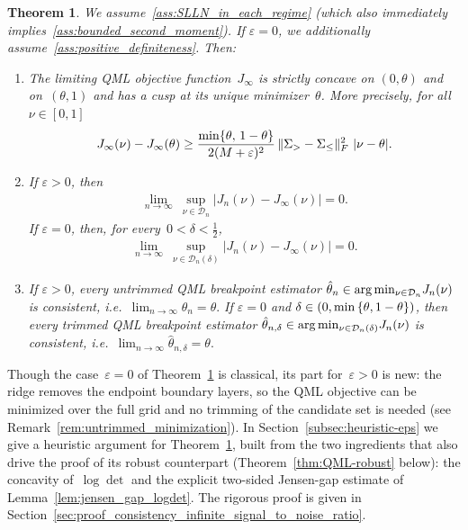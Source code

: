 \documentclass[10pt, letterpaper]{amsart}
\newtheorem{theorem}{Theorem}
\def\min{{\rm min}}
\begin{document}
\begin{theorem}\label{thm:classical_QML_consistency}
We assume~\ref{ass:SLLN_in_each_regime} (which also immediately implies~\ref{ass:bounded_second_moment}). If $\varepsilon=0$, we additionally assume~\ref{ass:positive_definiteness}. Then:
 \begin{enumerate}[label=(\roman*)]
     \item The limiting QML objective function~$J_\infty$ is strictly concave on $(0, \theta)$ and on~$(\theta, 1)$ and has a cusp at its unique minimizer~$\theta$. More precisely, for all~$\nu \in [0,1]$
     \begin{align}\label{equ:cusp_separation_J_infty}
         J_{\infty} (\nu) - J_{\infty}(\theta) \geq \frac{\min\{\theta,\,1-\theta\}}{2(M +\varepsilon)^2}\,\|\Sigma_{>} - \Sigma_{\leq}\|_F^2 \
 |\nu - \theta|.
     \end{align}
     \item If $\varepsilon>0$, then
     \begin{align}\label{equ:uniform_convergence_J_n_untrimmed}
         \lim_{n \to \infty}\ \sup_{\nu \in \mathcal D_n} |J_{n} (\nu) - J_{\infty} (\nu)| = 0.
     \end{align}
     If $\varepsilon=0$, then, for every~$0 < \delta < \frac{1}{2}$,
     \begin{align}\label{equ:uniform_convergence_J_n}
         \lim_{n \to \infty}\ \sup_{\nu \in \mathcal D_n(\delta)} |J_{n} (\nu) - J_{\infty} (\nu)| = 0.
     \end{align}
    \item If $\varepsilon>0$, every untrimmed QML breakpoint estimator $\hat \theta_{n}\in \arg \min_{\nu \in \mathcal D_n} J_n(\nu)$ is consistent, i.e.~$\lim_{n \to \infty} \hat \theta_n = \theta.$ \newline
If $\varepsilon=0$ and $\delta \in (0, \min\left\{ \theta, 1 - \theta \right\})$, then every trimmed QML breakpoint estimator $\hat \theta_{n,\delta}\in \arg \min_{\nu \in \mathcal D_n(\delta)} J_n(\nu)$ is consistent, i.e.~$\lim_{n \to \infty} \hat \theta_{n,\delta} = \theta.$
 \end{enumerate}
\end{theorem}

 Though the case~$\varepsilon=0$ of Theorem~\ref{thm:classical_QML_consistency} is classical, its part for~$\varepsilon>0$ is new: the ridge removes the endpoint boundary layers, so the QML objective can be minimized over the full grid and no trimming of the candidate set is needed (see Remark~\ref{rem:untrimmed_minimization}).
In Section~\ref{subsec:heuristic-eps} we give a heuristic argument for Theorem~\ref{thm:classical_QML_consistency}, built from the two ingredients that also drive the proof of its robust counterpart (Theorem~\ref{thm:QML-robust} below): the concavity of~$\log\det$ and the explicit two-sided Jensen-gap estimate of Lemma~\ref{lem:jensen_gap_logdet}. The rigorous proof is given in  Section~\ref{sec:proof_consistency_infinite_signal_to_noise_ratio}. 
\end{document}
